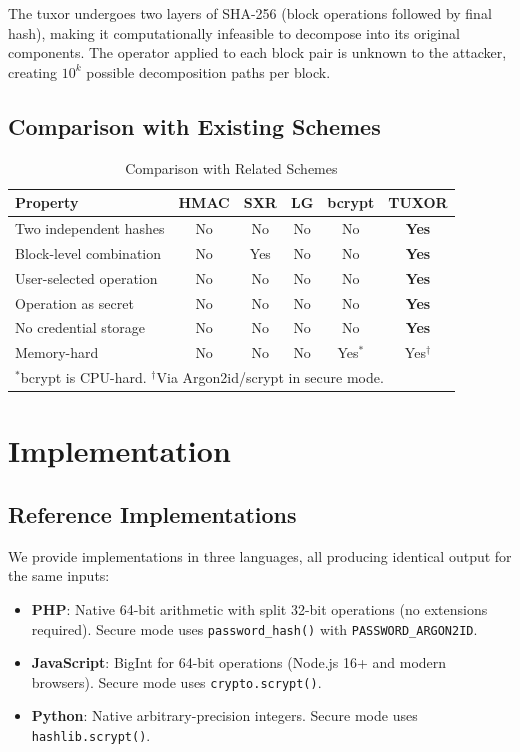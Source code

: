 \documentclass[11pt,a4paper]{article}
\begin{document}
The tuxor undergoes two layers of SHA-256 (block operations followed by final hash), making it computationally infeasible to decompose into its original components. The operator applied to each block pair is unknown to the attacker, creating $10^k$ possible decomposition paths per block.

\subsection{Comparison with Existing Schemes}

\begin{table}[h]
\centering
\caption{Comparison with Related Schemes}
\label{tab:comparison}
\begin{tabular}{@{}lccccc@{}}
\toprule
Property & HMAC & SXR & LG & bcrypt & \textbf{TUXOR} \\
\midrule
Two independent hashes & No & No & No & No & \textbf{Yes} \\
Block-level combination & No & Yes & No & No & \textbf{Yes} \\
User-selected operation & No & No & No & No & \textbf{Yes} \\
Operation as secret & No & No & No & No & \textbf{Yes} \\
No credential storage & No & No & No & No & \textbf{Yes} \\
Memory-hard & No & No & No & Yes$^*$ & Yes$^\dagger$ \\
\bottomrule
\multicolumn{6}{l}{\small $^*$bcrypt is CPU-hard. $^\dagger$Via Argon2id/scrypt in secure mode.}
\end{tabular}
\end{table}

\section{Implementation}

\subsection{Reference Implementations}

We provide implementations in three languages, all producing identical output for the same inputs:

\begin{itemize}[noitemsep]
  \item \textbf{PHP}: Native 64-bit arithmetic with split 32-bit operations (no extensions required). Secure mode uses \texttt{password\_hash()} with \texttt{PASSWORD\_ARGON2ID}.
  \item \textbf{JavaScript}: BigInt for 64-bit operations (Node.js 16+ and modern browsers). Secure mode uses \texttt{crypto.scrypt()}.
  \item \textbf{Python}: Native arbitrary-precision integers. Secure mode uses \texttt{hashlib.scrypt()}.
\end{itemize}
\end{document}
